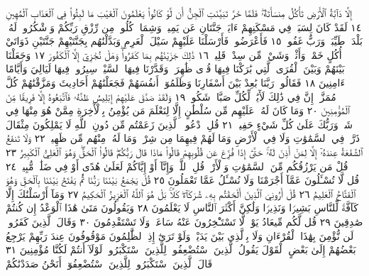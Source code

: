 إِلَّا دَآبَّةُ ٱلْأَرْضِ تَأْكُلُ مِنسَأَتَهُۥۖ فَلَمَّا خَرَّ تَبَيَّنَتِ ٱلْجِنُّ
أَن لَّوْ كَانُوا۟ يَعْلَمُونَ ٱلْغَيْبَ مَا لَبِثُوا۟ فِي ٱلْعَذَابِ ٱلْمُهِينِ ١٤
لَقَدْ كَانَ لِسَبَإࣲ فِي مَسْكَنِهِمْ ءَايَةࣱۖ جَنَّتَانِ عَن يَمِينࣲ وَشِمَالࣲۖ
كُلُوا۟ مِن رِّزْقِ رَبِّكُمْ وَٱشْكُرُوا۟ لَهُۥۚ بَلْدَةࣱ طَيِّبَةࣱ وَرَبٌّ غَفُورࣱ ١٥
فَأَعْرَضُوا۟ فَأَرْسَلْنَا عَلَيْهِمْ سَيْلَ ٱلْعَرِمِ وَبَدَّلْنَٰهُم بِجَنَّتَيْهِمْ
جَنَّتَيْنِ ذَوَاتَيْ أُكُلٍ خَمْطࣲ وَأَثْلࣲ وَشَيْءࣲ مِّن سِدْرࣲ قَلِيلࣲ ١٦
ذَٰلِكَ جَزَيْنَٰهُم بِمَا كَفَرُوا۟ۖ وَهَلْ نُجَٰزِيٓ إِلَّا ٱلْكَفُورَ ١٧
وَجَعَلْنَا بَيْنَهُمْ وَبَيْنَ ٱلْقُرَى ٱلَّتِي بَٰرَكْنَا فِيهَا قُرࣰى ظَٰهِرَةࣰ
وَقَدَّرْنَا فِيهَا ٱلسَّيْرَۖ سِيرُوا۟ فِيهَا لَيَالِيَ وَأَيَّامًا ءَامِنِينَ ١٨
فَقَالُوا۟ رَبَّنَا بَٰعِدْ بَيْنَ أَسْفَارِنَا وَظَلَمُوٓا۟ أَنفُسَهُمْ فَجَعَلْنَٰهُمْ
أَحَادِيثَ وَمَزَّقْنَٰهُمْ كُلَّ مُمَزَّقٍۚ إِنَّ فِي ذَٰلِكَ لَأٓيَٰتࣲ لِّكُلِّ صَبَّارࣲ
شَكُورࣲ ١٩ وَلَقَدْ صَدَّقَ عَلَيْهِمْ إِبْلِيسُ ظَنَّهُۥ فَٱتَّبَعُوهُ إِلَّا
فَرِيقࣰا مِّنَ ٱلْمُؤْمِنِينَ ٢٠ وَمَا كَانَ لَهُۥ عَلَيْهِم مِّن سُلْطَٰنٍ
إِلَّا لِنَعْلَمَ مَن يُؤْمِنُ بِٱلْأٓخِرَةِ مِمَّنْ هُوَ مِنْهَا فِي شَكࣲّۗ
وَرَبُّكَ عَلَىٰ كُلِّ شَيْءٍ حَفِيظࣱ ٢١ قُلِ ٱدْعُوا۟ ٱلَّذِينَ زَعَمْتُم مِّن
دُونِ ٱللَّهِ لَا يَمْلِكُونَ مِثْقَالَ ذَرَّةࣲ فِي ٱلسَّمَٰوَٰتِ وَلَا فِي
ٱلْأَرْضِ وَمَا لَهُمْ فِيهِمَا مِن شِرْكࣲ وَمَا لَهُۥ مِنْهُم مِّن ظَهِيرࣲ ٢٢
وَلَا تَنفَعُ ٱلشَّفَٰعَةُ عِندَهُۥٓ إِلَّا لِمَنْ أَذِنَ لَهُۥۚ حَتَّىٰٓ إِذَا فُزِّعَ عَن
قُلُوبِهِمْ قَالُوا۟ مَاذَا قَالَ رَبُّكُمْۖ قَالُوا۟ ٱلْحَقَّۖ وَهُوَ ٱلْعَلِيُّ ٱلْكَبِيرُ ٢٣
۞ قُلْ مَن يَرْزُقُكُم مِّنَ ٱلسَّمَٰوَٰتِ وَٱلْأَرْضِۖ قُلِ ٱللَّهُۖ
وَإِنَّآ أَوْ إِيَّاكُمْ لَعَلَىٰ هُدًى أَوْ فِي ضَلَٰلࣲ مُّبِينࣲ ٢٤ قُل
لَّا تُسْـَٔلُونَ عَمَّآ أَجْرَمْنَا وَلَا نُسْـَٔلُ عَمَّا تَعْمَلُونَ ٢٥ قُلْ
يَجْمَعُ بَيْنَنَا رَبُّنَا ثُمَّ يَفْتَحُ بَيْنَنَا بِٱلْحَقِّ وَهُوَ ٱلْفَتَّاحُ ٱلْعَلِيمُ ٢٦
قُلْ أَرُونِيَ ٱلَّذِينَ أَلْحَقْتُم بِهِۦ شُرَكَآءَۖ كَلَّاۚ بَلْ هُوَ ٱللَّهُ
ٱلْعَزِيزُ ٱلْحَكِيمُ ٢٧ وَمَآ أَرْسَلْنَٰكَ إِلَّا كَآفَّةࣰ لِّلنَّاسِ
بَشِيرࣰا وَنَذِيرࣰا وَلَٰكِنَّ أَكْثَرَ ٱلنَّاسِ لَا يَعْلَمُونَ ٢٨
وَيَقُولُونَ مَتَىٰ هَٰذَا ٱلْوَعْدُ إِن كُنتُمْ صَٰدِقِينَ ٢٩
قُل لَّكُم مِّيعَادُ يَوْمࣲ لَّا تَسْتَـْٔخِرُونَ عَنْهُ سَاعَةࣰ وَلَا تَسْتَقْدِمُونَ ٣٠
وَقَالَ ٱلَّذِينَ كَفَرُوا۟ لَن نُّؤْمِنَ بِهَٰذَا ٱلْقُرْءَانِ وَلَا
بِٱلَّذِي بَيْنَ يَدَيْهِۗ وَلَوْ تَرَىٰٓ إِذِ ٱلظَّٰلِمُونَ مَوْقُوفُونَ عِندَ
رَبِّهِمْ يَرْجِعُ بَعْضُهُمْ إِلَىٰ بَعْضٍ ٱلْقَوْلَ يَقُولُ ٱلَّذِينَ
ٱسْتُضْعِفُوا۟ لِلَّذِينَ ٱسْتَكْبَرُوا۟ لَوْلَآ أَنتُمْ لَكُنَّا مُؤْمِنِينَ ٣١
قَالَ ٱلَّذِينَ ٱسْتَكْبَرُوا۟ لِلَّذِينَ ٱسْتُضْعِفُوٓا۟ أَنَحْنُ صَدَدْنَٰكُمْ
